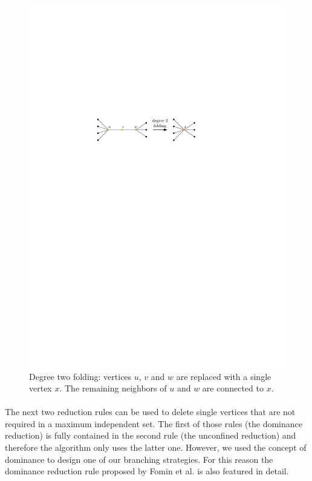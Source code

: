 \documentclass[12pt,a4paper,twoside]{scrartcl}
\numberwithin{equation}{section}
\begin{document}
\begin{figure}[htb]
	\captionsetup{belowskip=-1em}
	\includegraphics[scale=1.5]{images/deg2_red}
\centering
\caption{Degree two folding: vertices $u$, $v$ and $w$ are replaced with a single vertex $x$. The remaining neighbors of $u$ and $w$ are connected to $x$.}
\label{fig:dg2}
\end{figure}
\paragraph{}
The next two reduction rules can be used to delete single vertices that are not required in a maximum independent set. The first of those rules (the dominance reduction) is fully contained in the second rule (the unconfined reduction) and therefore the algorithm only uses the latter one. However, we used the concept of dominance to design one of our branching strategies. For this reason the dominance reduction rule proposed by Fomin et al. \cite{Fomin} is also featured in detail.
\end{document}
